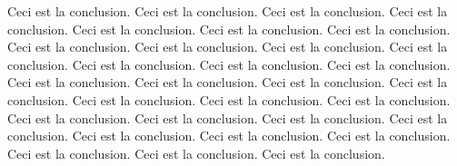 \Conclusion
    Ceci est la conclusion. 
    Ceci est la conclusion. 
    Ceci est la conclusion. 
    Ceci est la conclusion. 
    Ceci est la conclusion. 
    Ceci est la conclusion. 
    Ceci est la conclusion. 
    Ceci est la conclusion. 
    Ceci est la conclusion. 
    Ceci est la conclusion. 
    Ceci est la conclusion. 
    Ceci est la conclusion. 
    Ceci est la conclusion. 
    Ceci est la conclusion. 
    Ceci est la conclusion. 
    Ceci est la conclusion. 
    Ceci est la conclusion. 
    Ceci est la conclusion. 
    Ceci est la conclusion. 
    Ceci est la conclusion. 
    Ceci est la conclusion. 
    Ceci est la conclusion. 
    Ceci est la conclusion. 
    Ceci est la conclusion. 
    Ceci est la conclusion. 
    Ceci est la conclusion. 
    Ceci est la conclusion. 
    Ceci est la conclusion. 
    Ceci est la conclusion. 
    Ceci est la conclusion. 
    Ceci est la conclusion. 

